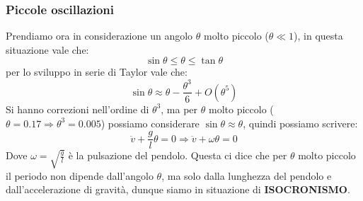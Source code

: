         \subsubsection{Piccole oscillazioni}
            Prendiamo ora in considerazione un angolo $\theta$ molto piccolo ($\theta \ll 1$), in questa situazione vale che:
            $$
                \sin \theta \leq \theta \leq \tan \theta
            $$
            per lo sviluppo in serie di Taylor vale che:
            $$  
                \sin \theta \approx \theta - \frac{\theta^3}{6} + O(\theta^5)
            $$
            Si hanno correzioni nell'ordine di $\theta^3$, ma per $\theta$ molto piccolo ($\theta = 0.17 \Rightarrow \theta^3 = 0.005$) possiamo considerare $\sin \theta \approx \theta$, quindi possiamo scrivere:
            $$
                \ddot{v}+\frac{g}{l}\theta = 0 \Rightarrow \ddot{v}+\omega\theta = 0
            $$
            Dove $\omega = \sqrt{\frac{g}{l}}$ è la pulsazione del pendolo. Questa ci dice che per $\theta$ molto piccolo il periodo non dipende dall'angolo $\theta$, ma solo dalla lunghezza del pendolo e dall'accelerazione di gravità, dunque siamo in situazione di \textbf{ISOCRONISMO}.